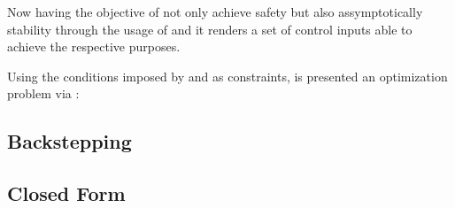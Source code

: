 Now having the objective of not only achieve safety but also assymptotically stability through the usage of  and  it renders a set of control inputs able to achieve the respective purposes.

Using the conditions imposed by  and  as constraints, is presented an optimization problem  via :





\subsection{Backstepping}
\label{sub:backstepping}

\subsection{Closed Form}
\label{sub:closed_form}























\endinput







   



